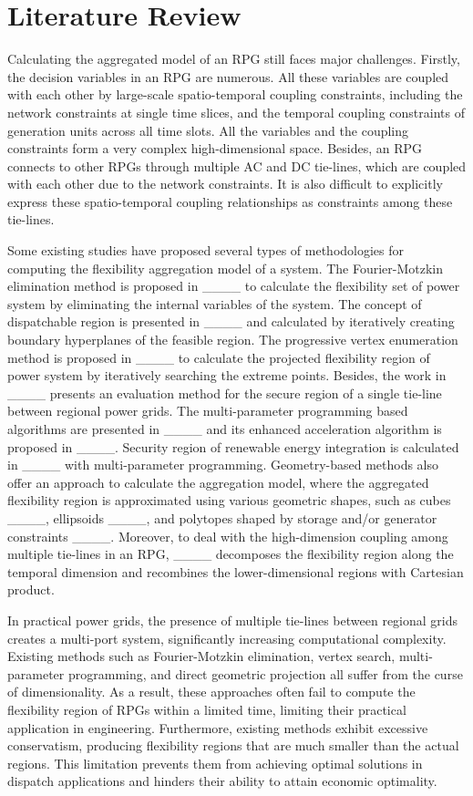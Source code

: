 \section{Literature Review}
Calculating the aggregated model of an RPG still faces major challenges. 
Firstly, the decision variables in an RPG are numerous. 
All these variables are coupled with each other by large-scale spatio-temporal coupling constraints, including the network constraints at single time slices, and the temporal coupling constraints of generation units across all time slots. 
All the variables and the coupling constraints form a very complex high-dimensional space.
Besides, an RPG connects to other RPGs through multiple AC and DC tie-lines, which are coupled with each other due to the network constraints. It is also difficult to explicitly express these spatio-temporal coupling relationships as constraints among these tie-lines.


Some existing studies have proposed several types of methodologies for computing the flexibility aggregation model of a system. 
The Fourier-Motzkin elimination method is proposed in ____ to calculate the flexibility set of power system by eliminating the internal variables of the system.
The concept of dispatchable region is presented in ____ and calculated by iteratively creating boundary hyperplanes of the feasible region. 
The progressive vertex enumeration method is proposed in ____ to calculate the projected flexibility region of power system by iteratively searching the extreme points. 
Besides, the work in ____ presents an evaluation method for the secure region of a single tie-line between regional power grids. 
The multi-parameter programming based algorithms are presented in ____ and its enhanced acceleration algorithm is proposed in ____. 
Security region of renewable energy integration is calculated in ____ with multi-parameter programming.
Geometry-based methods also offer an approach to calculate the aggregation model, where the aggregated flexibility region is approximated using various geometric shapes, such as cubes ____, ellipsoids ____, and polytopes shaped by storage and/or generator constraints ____.
Moreover, to deal with the high-dimension coupling among multiple tie-lines in an RPG, ____ decomposes the flexibility region along the temporal dimension and recombines the lower-dimensional regions with Cartesian product. 

In practical power grids, the presence of multiple tie-lines between regional grids creates a multi-port system, significantly increasing computational complexity. 
Existing methods such as Fourier-Motzkin elimination, vertex search, multi-parameter programming, and direct geometric projection all suffer from the curse of dimensionality. 
As a result, these approaches often fail to compute the flexibility region of RPGs within a limited time, limiting their practical application in engineering.  
Furthermore, existing methods exhibit excessive conservatism, producing flexibility regions that are much smaller than the actual regions.
This limitation prevents them from achieving optimal solutions in dispatch applications and hinders their ability to attain economic optimality.